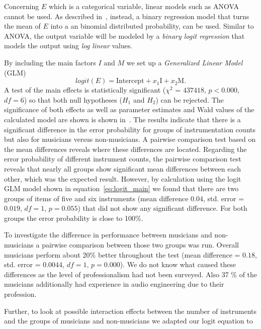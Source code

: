 \par
Concerning $E$ which is a categorical variable, linear models such as ANOVA cannot be used.
As described in~\cite{jaeger08}, instead, a binary regression model that turns the mean of $E$ into a an binomial distributed probability, can be used. 
Similar to ANOVA, the output variable will be modeled by a \emph{binary logit regression} that models the output using \emph{log linear} values.
\par
By including the main factors $I$ and $M$ we set up a \emph{Generalized Linear Model} (GLM)
\begin{equation}
	logit(E) =  \text{Intercept} + x_1 \text{I} + x_2 \text{M} .
	\label{eq:logit_main}
\end{equation}
A test of the main effects is statistically significant ($\chi^2$ = $437418$, $p < 0.000$, $df = 6$) so that both null hypotheses ($H_1$ and $H_2$) can be rejected. The significance of both effects as well as parameter estimates and Wald values of the calculated model are shown is shown in~\cite{stoeter13}. 
The results indicate that there is a significant difference in the error probability for groups of instrumentation counts but also for musicians versus non-musicians. A pairwise comparison test based on the mean differences reveals where these differences are located. Regarding the error probability of different instrument counts, the pairwise comparison test reveals that nearly all groups show significant mean differences between each other, which was the expected result. However, by calculation using the logit GLM model shown in equation~\ref{eq:logit_main} we found that there are two groups of items of five and six instruments (mean difference $0.04$, std. error = $0.019$, $df = 1$, $p = 0.055$) that did not show any significant difference. For both groups the error probability is close to 100\%.
\par
To investigate the difference in performance between musicians and non-musicians a pairwise comparison between those two groups was run. Overall musicians perform about 20\% better throughout the test (mean difference = $0.18$, std. error = $ 0.0044$, $df = 1$, $p=0.000$). We do not know what caused these differences as the level of professionalism had not been surveyed. Also 37 \% of the musicians additionally had experience in audio engineering due to their profession.
\par
Further, to look at possible interaction effects between the number of instruments and the groups of musicians and non-musicians we adapted our logit equation to
